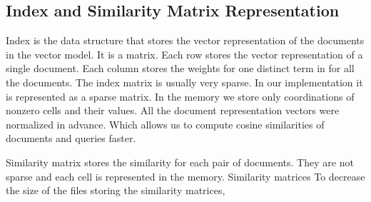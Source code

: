 \subsection{Index and Similarity Matrix Representation}

Index is the data structure that stores the vector representation of the documents in the vector model. It is a matrix. Each row stores the vector representation of a single document. Each column stores the weights for one distinct term in for all the documents. The index matrix is usually very sparse. In our implementation it is represented as a sparse matrix. In the memory we store only coordinations of nonzero cells and their values. All the document representation vectors were normalized in advance. Which allows us to compute cosine similarities of documents and queries faster.

Similarity matrix stores the similarity for each pair of documents. They are not sparse and each cell is represented in the memory. Similarity matrices To decrease the size of the files storing the similarity matrices, 
